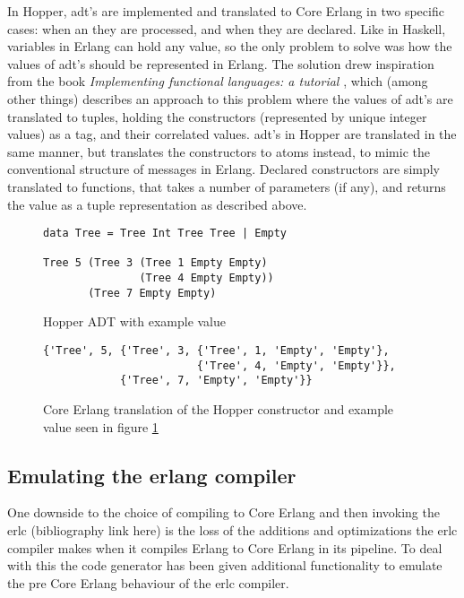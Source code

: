 In Hopper, \gls{adt}'s are implemented and translated to Core Erlang in two specific cases: when an
they are processed, and when they are declared. Like in Haskell, variables in Erlang can
hold any value, so the only problem to solve was how the values of \gls{adt}'s should be represented in
Erlang. The solution drew inspiration from the book \textit{Implementing functional languages: a tutorial} \cite{FunTutorial},
which (among other things) describes an approach to this problem where the values of \gls{adt}'s are translated to tuples,
holding the constructors (represented by unique integer values) as a tag, and their correlated values.%
\gls{adt}'s in Hopper are translated in the same manner, but translates the constructors to atoms instead,
to mimic the conventional structure of messages in Erlang.%
Declared constructors are simply translated to functions, that takes a number of parameters (if any), and
returns the value as a tuple representation as described above.%


\begin{figure}[!htb]
\centering
\begin{lstlisting} 
data Tree = Tree Int Tree Tree | Empty

Tree 5 (Tree 3 (Tree 1 Empty Empty) 
               (Tree 4 Empty Empty)) 
       (Tree 7 Empty Empty)
\end{lstlisting}
\caption{Hopper ADT with example value}
\label{lst:hopperAdt}
\end{figure}

\begin{figure}[!htb]
\centering
\begin{lstlisting} 
{'Tree', 5, {'Tree', 3, {'Tree', 1, 'Empty', 'Empty'},
                        {'Tree', 4, 'Empty', 'Empty'}},
            {'Tree', 7, 'Empty', 'Empty'}}
\end{lstlisting}
\caption[Core Erlang translation of constructor and example value]
 {Core Erlang translation of the Hopper constructor and example value seen in figure \ref{lst:hopperAdt}}
\label{lst:coreAdt}
\end{figure}


\subsection{Emulating the erlang compiler}

One downside to the choice of compiling to Core Erlang and then invoking the erlc
(bibliography link here) is the loss of the additions and optimizations the erlc
compiler makes when it compiles Erlang to Core Erlang in its pipeline. To deal with this
the code generator has been given additional functionality to emulate the pre Core Erlang
behaviour of the erlc compiler. 